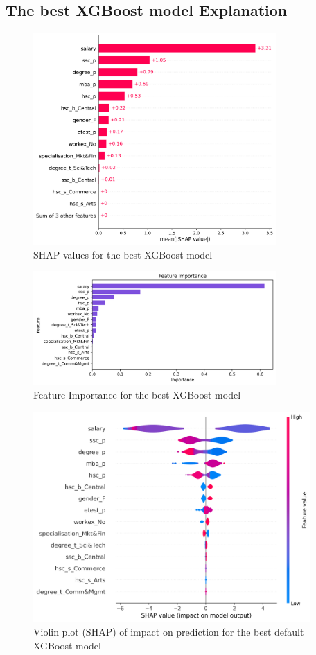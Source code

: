 \documentclass{article}%
\begin{document}
\subsection{The best XGBoost model Explanation}%
\label{subsec:ThebestXGBoostmodelExplanation}%


\begin{figure}[h!]%
\centering%
\includegraphics[width=350px]{XAI/XGBoost/global_feature_importance_shap.png}%
\caption{SHAP values for the best XGBoost model}%
\end{figure}

%


\begin{figure}[h!]%
\centering%
\includegraphics[width=350px]{XAI/XGBoost/feature_importance.png}%
\caption{Feature Importance for the best XGBoost model}%
\end{figure}

%


\begin{figure}[h!]%
\centering%
\includegraphics[width=400px]{XAI/XGBoost/violin_summary_plot_shap.png}%
\caption{Violin plot (SHAP) of impact on prediction for the best default XGBoost model}%
\end{figure}

%
\end{document}
